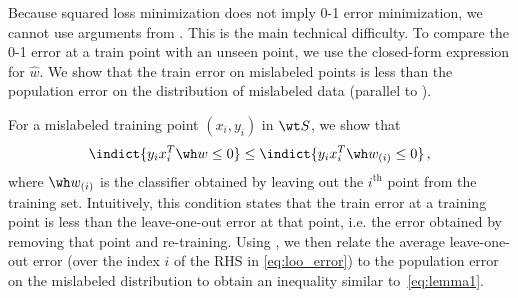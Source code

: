 \begin{hproof}
    Because squared loss minimization  
    does not imply 0-1 error minimization, 
    we cannot use arguments 
    from . 
    This is the main technical difficulty.  
    To compare the 0-1 error at a train point with an unseen point, 
    we use the  closed-form expression for $\widehat{w}$.
    We show that the train error on mislabeled points  
    is less than the population error on the distribution of mislabeled data
    (parallel to ). 
    
    For a mislabeled 
    training point $(x_i, y_i)$ in $\wt S$, we show that
    \begin{align}
        \indict{y_i x_i^T \wh w \le 0 } \le \indict{y_i x_i^T \wh w_{(i)} \le 0 } \,, \label{eq:loo_error}
    \end{align}
    where $\wh w_{(i)}$ is the classifier obtained
    by leaving out the $i^\text{th}$ point from the training set. 
    Intuitively, this condition
    states
    that the train error at a training point 
    is less than the leave-one-out error at that point, i.e. the error obtained 
    by removing that point and re-training.
    Using , we then relate the average leave-one-out error 
    (over the index $i$ of the RHS in \eqref{eq:loo_error}) 
    to the population error on the mislabeled distribution 
    to obtain an inequality similar to~\eqref{eq:lemma1}.
\end{hproof}



